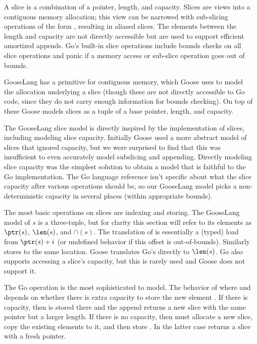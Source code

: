 A slice is a combination of a pointer, length, and capacity. Slices are
views into a contiguous memory allocation; this view can be narrowed
with sub-slicing operations of the form , resulting
in aliased slices. The elements between the length and capacity are not
directly accessible but are used to support efficient amortized appends.
Go's built-in slice operations include bounds checks on all slice
operations and panic if a memory access or sub-slice operation goes out
of bounds.

GooseLang has a primitive for contiguous memory, which Goose uses to model
the allocation underlying a slice (though these are not directly
accessible to Go code, since they do not carry enough information for
bounds checking). On top of these Goose models slices as a tuple of a base
pointer, length, and capacity.

The GooseLang slice model is directly inspired by the implementation of
slices, including modeling slice capacity. Initially Goose used a more
abstract model of slices that ignored capacity, but we were surprised to find that this was insufficient to
even accurately model subslicing and appending. Directly modeling slice
capacity was the simplest solution to obtain a model that is faithful to
the Go implementation. The Go language reference isn't specific about
what the slice capacity after various operations should be, so our
GooseLang model picks a non-deterministic capacity in several places
(within appropriate bounds).


The most basic operations on slices are indexing and storing. The
GooseLang model of $s$ is a three-tuple, but for clarity this section will refer
to its elements as $\ptr(s)$, $\len(s)$, and $\cap(s)$. The
translation of  is essentially a (typed) load from
$\ptr(s) + i$ (or undefined behavior if this offset is out-of-bounds).
Similarly  stores to the same location. Goose
translates Go's  directly to $\len(s)$. Go also supports
accessing a slice's capacity, but this is rarely used and Goose does not
support it.

The Go  operation is the most sophisticated to model. The
behavior of  where  and
 depends on whether there is extra capacity to store the
new element . If there is capacity, then  is stored
there and the append returns a new slice with the same pointer but a
larger length. If there is no capacity, then  must
allocate a new slice, copy the existing elements to it, and then store
. In the latter case  returns a slice with a
fresh pointer.

